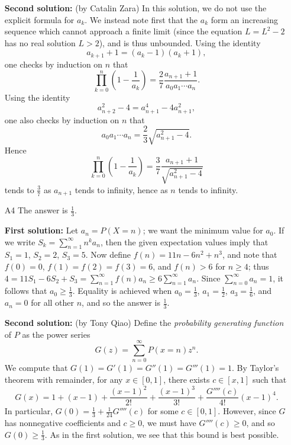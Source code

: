 \documentclass[amssymb,twocolumn,pra,10pt,aps]{revtex4-1}
\begin{document}
\begin{itemize}
\textbf{Second solution:}
(by Catalin Zara)
In this solution, we do not use the explicit formula for $a_k$.
We instead note first that the $a_k$ form an increasing sequence which cannot approach a finite limit (since the equation $L = L^2 - 2$ has no real solution $L>2$), and is thus 
unbounded. Using the identity
\[
a_{k+1} + 1 = (a_k - 1)(a_k + 1),
\]
one checks by induction on $n$ that
\[
\prod_{k=0}^n \left( 1 - \frac{1}{a_k} \right)
= \frac{2}{7} \frac{a_{n+1} + 1}{a_0 a_1 \cdots a_n}.
\]
Using the identity
\[
a_{n+2}^2 - 4 = a_{n+1}^4 - 4 a_{n+1}^2,
\]
one also checks by induction on $n$ that
\[
a_0 a_1 \cdots a_n = \frac{2}{3} \sqrt{a_{n+1}^2 - 4}.
\]
Hence
\[
\prod_{k=0}^n \left( 1 - \frac{1}{a_k} \right)
= \frac{3}{7} \frac{a_{n+1} + 1}{\sqrt{a_{n+1}^2 - 4}}
\]
tends to $\frac{3}{7}$ as $a_{n+1}$ tends to infinity, hence as $n$ tends to infinity.

\item[A4]
The answer is $\frac{1}{3}$.

\textbf{First solution:}
Let $a_n = P(X=n)$; we want the minimum value for $a_0$. If we write 
$S_k = \sum_{n=1}^\infty n^k a_n$, then the given expectation values 
imply that $S_1 = 1$, $S_2 = 2$, $S_3 = 5$. Now
define $f(n) = 11n-6n^2+n^3$, and note that $f(0) = 0$, $f(1)=f(2)=f(3)=6$, and 
$f(n)>6$ for $n\geq 4$; thus
$4 = 11S_1-6S_2+S_3 = \sum_{n=1}^\infty f(n)a_n \geq 6 \sum_{n=1}^{\infty} a_n$. 
Since $\sum_{n=0}^\infty a_n = 1$, it 
follows that $a_0 \geq \frac{1}{3}$. Equality is achieved 
when $a_0=\frac{1}{3}$, $a_1=\frac{1}{2}$, $a_3=\frac{1}{6}$, and $a_n = 0$ for all other $n$, 
and so the answer is $\frac{1}{3}$.

\textbf{Second solution:}
(by Tony Qiao)
Define the \emph{probability generating function} of $P$ as the power series
\[
G(z) = \sum_{n=0}^\infty P(x = n) z^n.
\]
We compute that $G(1) = G'(1) = G''(1) = G'''(1) = 1$. By Taylor's theorem with remainder,
for any $x \in [0,1]$, there exists $c \in [x,1]$ such that
\[
G(x) = 1 + (x-1) + \frac{(x-1)^2}{2!} + \frac{(x-1)^3}{3!} + \frac{G''''(c)}{4!} (x-1)^4.
\]
In particular, $G(0) = \frac{1}{3} + \frac{1}{24} G''''(c)$ for some $c \in [0,1]$.
However, since $G$ has nonnegative coefficients and $c \geq 0$, we must have $G''''(c) \geq 0$,
and so $G(0) \geq \frac{1}{3}$. As in the first solution, we see that this bound is best possible.


\end{itemize}
\end{document}
